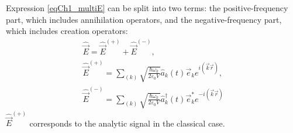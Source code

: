 Expression \eqref{eqCh1_multiE} can be split into two terms:
the positive-frequency part, which includes annihilation operators,
and the negative-frequency part, which includes creation operators:
\begin{eqnarray}
\hat{\vec{E}} = \hat{\vec{E}}^{(+)} + \hat{\vec{E}}^{(-)},
\nonumber \\
\hat{\vec{E}}^{(+)} = \sum_{(k)} \sqrt{\frac{\hbar \omega_k}{2 \varepsilon_0
V}} \hat{a}_k\left(t\right) \vec{e}_k e^{i \left(\vec{k}\vec{r}
  \right)}, 
\nonumber \\
\hat{\vec{E}}^{(-)} = \sum_{(k)} \sqrt{\frac{\hbar \omega_k}{2 \varepsilon_0
V}}
\hat{a}_k^{\dag}\left(t\right) \vec{e}_k^{*} e^{-i \left(\vec{k}\vec{r} \right)}
\label{eqCh1_79}
\end{eqnarray} 
$\hat{\vec{E}}^{(+)}$ corresponds to the analytic signal in the 
classical case. 
